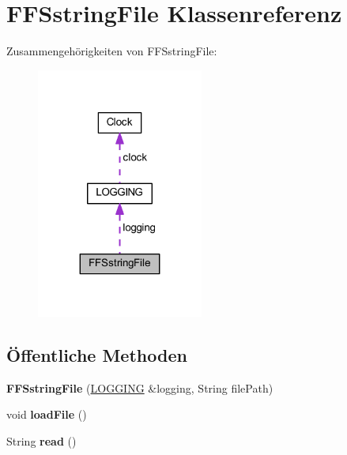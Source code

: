 \hypertarget{class_f_f_sstring_file}{}\section{F\+F\+Sstring\+File Klassenreferenz}
\label{class_f_f_sstring_file}


Zusammengehörigkeiten von F\+F\+Sstring\+File\+:
\nopagebreak
\begin{figure}[H]
\begin{center}
\leavevmode
\includegraphics[width=155pt]{class_f_f_sstring_file__coll__graph}
\end{center}
\end{figure}
\subsection*{Öffentliche Methoden}
\begin{DoxyCompactItemize}
\item 
\mbox{\label{class_f_f_sstring_file_aa5d7d691833c08b78a6fe1417bc405b7}} 
{\bfseries F\+F\+Sstring\+File} (\hyperlink{class_l_o_g_g_i_n_g}{L\+O\+G\+G\+I\+NG} \&logging, String file\+Path)
\item 
\mbox{\label{class_f_f_sstring_file_a4ba9dc7c294994f6530475a6b5748ca5}} 
void {\bfseries load\+File} ()
\item 
\mbox{\label{class_f_f_sstring_file_a83bdfffdcd8db1c924402997c0ed5b4e}} 
String {\bfseries read} ()
\end{DoxyCompactItemize}
